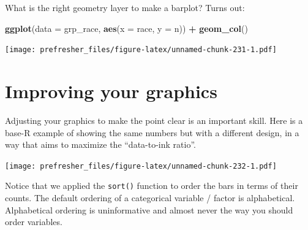 \documentclass[
]{book}
\newenvironment{Shaded}{\begin{snugshade}}{\end{snugshade}}
\newcommand{\CommentTok}[1]{\textcolor[rgb]{0.56,0.35,0.01}{\textit{#1}}}
\newcommand{\DataTypeTok}[1]{\textcolor[rgb]{0.13,0.29,0.53}{#1}}
\newcommand{\DecValTok}[1]{\textcolor[rgb]{0.00,0.00,0.81}{#1}}
\newcommand{\KeywordTok}[1]{\textcolor[rgb]{0.13,0.29,0.53}{\textbf{#1}}}
\newcommand{\NormalTok}[1]{#1}
\newcommand{\OperatorTok}[1]{\textcolor[rgb]{0.81,0.36,0.00}{\textbf{#1}}}
\newcommand{\OtherTok}[1]{\textcolor[rgb]{0.56,0.35,0.01}{#1}}
\newcommand{\StringTok}[1]{\textcolor[rgb]{0.31,0.60,0.02}{#1}}
\theoremstyle{definition}
\theoremstyle{definition}
\theoremstyle{definition}
\theoremstyle{remark}
\begin{document}
What is the right geometry layer to make a barplot? Turns out:

\begin{Shaded}
\begin{Highlighting}[]
\KeywordTok{ggplot}\NormalTok{(}\DataTypeTok{data =}\NormalTok{ grp\_race, }\KeywordTok{aes}\NormalTok{(}\DataTypeTok{x =}\NormalTok{ race, }\DataTypeTok{y =}\NormalTok{ n)) }\OperatorTok{+}\StringTok{ }\KeywordTok{geom\_col}\NormalTok{()}
\end{Highlighting}
\end{Shaded}

\texttt{[image: prefresher\_files/figure-latex/unnamed-chunk-231-1.pdf]}

\hypertarget{improving-your-graphics}{%
\section{Improving your graphics}\label{improving-your-graphics}}

Adjusting your graphics to make the point clear is an important skill. Here is a base-R example of showing the same numbers but with a different design, in a way that aims to maximize the ``data-to-ink ratio''.

\begin{Shaded}
\end{Shaded}

\texttt{[image: prefresher\_files/figure-latex/unnamed-chunk-232-1.pdf]}

Notice that we applied the \texttt{sort()} function to order the bars in terms of their counts. The default ordering of a categorical variable / factor is alphabetical. Alphabetical ordering is uninformative and almost never the way you should order variables.
\end{document}
